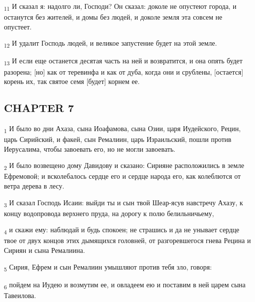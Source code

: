 \begin{tcolorbox}
\textsubscript{11} И сказал я: надолго ли, Господи? Он сказал: доколе не опустеют города, и останутся без жителей, и домы без людей, и доколе земля эта совсем не опустеет.
\end{tcolorbox}
\begin{tcolorbox}
\textsubscript{12} И удалит Господь людей, и великое запустение будет на этой земле.
\end{tcolorbox}
\begin{tcolorbox}
\textsubscript{13} И если еще останется десятая часть на ней и возвратится, и она опять будет разорена; [но] как от теревинфа и как от дуба, когда они и срублены, [остается] корень их, так святое семя [будет] корнем ее.
\end{tcolorbox}
\subsection{CHAPTER 7}
\begin{tcolorbox}
\textsubscript{1} И было во дни Ахаза, сына Иоафамова, сына Озии, царя Иудейского, Рецин, царь Сирийский, и факей, сын Ремалиин, царь Израильский, пошли против Иерусалима, чтобы завоевать его, но не могли завоевать.
\end{tcolorbox}
\begin{tcolorbox}
\textsubscript{2} И было возвещено дому Давидову и сказано: Сирияне расположились в земле Ефремовой; и всколебалось сердце его и сердце народа его, как колеблются от ветра дерева в лесу.
\end{tcolorbox}
\begin{tcolorbox}
\textsubscript{3} И сказал Господь Исаии: выйди ты и сын твой Шеар-ясув навстречу Ахазу, к концу водопровода верхнего пруда, на дорогу к полю белильничьему,
\end{tcolorbox}
\begin{tcolorbox}
\textsubscript{4} и скажи ему: наблюдай и будь спокоен; не страшись и да не унывает сердце твое от двух концов этих дымящихся головней, от разгоревшегося гнева Рецина и Сириян и сына Ремалиина.
\end{tcolorbox}
\begin{tcolorbox}
\textsubscript{5} Сирия, Ефрем и сын Ремалиин умышляют против тебя зло, говоря:
\end{tcolorbox}
\begin{tcolorbox}
\textsubscript{6} пойдем на Иудею и возмутим ее, и овладеем ею и поставим в ней царем сына Тавеилова.
\end{tcolorbox}
